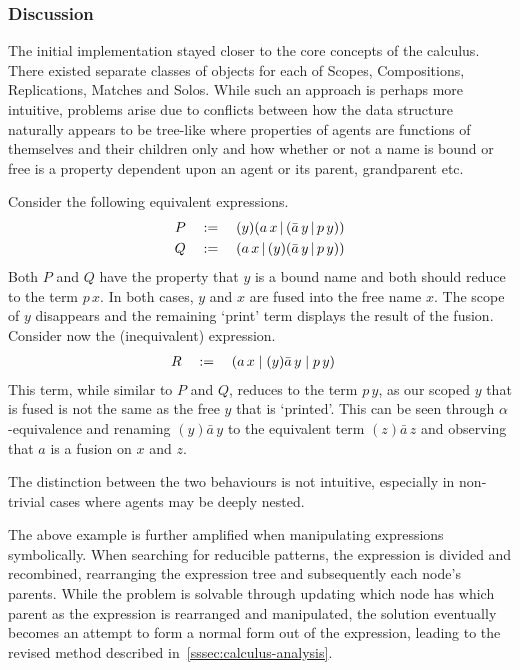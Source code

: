     \subsubsection{Discussion}
        The initial implementation stayed closer to the core concepts of the calculus.
        There existed separate classes of objects for each of Scopes, Compositions, Replications, Matches and Solos.
        While such an approach is perhaps more intuitive, problems arise due to conflicts between how the data structure naturally appears to be tree-like where properties of agents are functions of themselves and their children only and how whether or not a name is bound or free is a property dependent upon an agent or its parent, grandparent etc.

        \begin{example*}
            Consider the following equivalent expressions.
            \begin{align*}
                P \quad & := \quad (y)(a \, x \,|\, (\bar{a} \, y \,|\, p \, y)) \\
                Q \quad & := \quad (a \, x \,|\, (y)(\bar{a} \, y \,|\, p \, y))
            \end{align*}
            Both $P$ and $Q$ have the property that $y$ is a bound name and both should reduce to the term $p \, x$.
            In both cases, $y$ and $x$ are fused into the free name $x$. The scope of $y$ disappears and the remaining `print' term displays the result of the fusion.
            Consider now the (inequivalent) expression.
            \begin{align*}
                R \quad & := \quad (a \, x \; | \; (y)\bar{a} \, y \; | \; p \, y)
            \end{align*}
            This term, while similar to $P$ and $Q$, reduces to the term $p \, y$, as our scoped $y$ that is fused is not the same as the free $y$ that is `printed'.
            This can be seen through $\alpha$-equivalence and renaming $(y)\bar{a} \, y$ to the equivalent term $(z)\bar{a} \, z$ and observing that $a$ is a fusion on $x$ and $z$.

            The distinction between the two behaviours is not intuitive, especially in non-trivial cases where agents may be deeply nested.
        \end{example*}

        The above example is further amplified when manipulating expressions symbolically.
        When searching for reducible patterns, the expression is divided and recombined, rearranging the expression tree and subsequently each node's parents.
        While the problem is solvable through updating which node has which parent as the expression is rearranged and manipulated, the solution eventually becomes an attempt to form a normal form out of the expression, leading to the revised method described in~\ref{sssec:calculus-analysis}.\\

